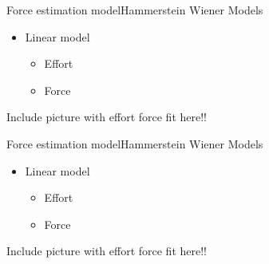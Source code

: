 
\begin{frame}{Force estimation model}{Hammerstein Wiener Models}
\begin{itemize}
\item Linear model
  \begin{itemize}
  \item Effort 
  \item Force
  \end{itemize}
\end{itemize}

Include picture with effort force fit here!! 


\end{frame}



\begin{frame}{Force estimation model}{Hammerstein Wiener Models}
\begin{itemize}
\item Linear model
  \begin{itemize}
  \item Effort 
  \item Force
  \end{itemize}
\end{itemize}

Include picture with effort force fit here!! 



\end{frame}







